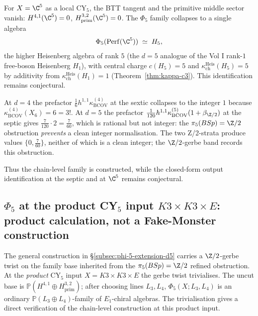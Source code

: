 \begin{example}
\label{ex:c5-higher-heisenberg}
For \(X=\C^5\) as a local CY${}_5$, the BTT tangent and the primitive
middle sector vanish:
\(H^{4,1}(\C^5)=0\), \(H^{3,2}_{\mathrm{prim}}(\C^5)=0\). The $\Phi_5$ family
collapses to a single algebra
\[
 \Phi_5(\mathrm{Perf}(\C^5)) \;\simeq\; H_5,
\]
the higher Heisenberg algebra of rank $5$ \textup{(}the $d = 5$ analogue of the
Vol I rank-$1$ free-boson Heisenberg $H_1$\textup{)}, with central charge
$c(H_5) = 5$ and $\kappa_{\mathrm{ch}}^{\mathrm{Heis}}(H_5) = 5$ by additivity from
$\kappa_{\mathrm{ch}}^{\mathrm{Heis}}(H_1) = 1$ \textup{(}Theorem~\textup{\ref{thm:kappa-c3}}\textup{).} This identification remains conjectural.
\end{example}

\begin{remark}
\label{rem:phi-5-prefactor-not-integer}
At $d = 4$ the prefactor $\tfrac{1}{6} h^{1,1} \kappa_{\mathrm{BCOV}}^{(4)}$ at the sextic
collapses to the integer $1$ because $\kappa_{\mathrm{BCOV}}^{(4)}(X_6) = 6 = 3!$. At $d = 5$
the prefactor $\tfrac{1}{120} h^{1,1} \kappa_{\mathrm{BCOV}}^{(5)} (1 + \beta_{\Z/2})$ at the
septic gives $\tfrac{7}{120} \cdot 2 = \tfrac{7}{60}$, which is rational but not
integer: the $\pi_5(BSp) = \Z/2$ obstruction \emph{prevents} a clean integer
normalisation. The two Z/2-strata produce values $\{0, \tfrac{7}{60}\}$, neither
of which is a clean integer; the $\Z/2$-gerbe band records this obstruction.
\end{remark}
Thus the chain-level family is constructed, while the closed-form
output identification at the septic and at $\C^5$ remains conjectural.

\subsection{\texorpdfstring{$\Phi_5$}{Phi-5} at the product CY\texorpdfstring{${}_5$}{-5} input \texorpdfstring{$K3 \times K3 \times E$}{K3 x K3 x E}:
 product calculation, not a Fake-Monster construction}
\label{subsec:phi-5-K3-K3-E-theorem}

The general construction in \S\ref{subsec:phi-5-extension-d5} carries a
$\Z/2$-gerbe twist on the family base inherited from the $\pi_5(BSp) = \Z/2$
refined obstruction. At the \emph{product} CY${}_5$ input
\(X=K3\times K3\times E\) the gerbe twist trivialises. The uncut base is
\(\mathbb P(H^{4,1}\oplus H^{3,2}_{\mathrm{prim}})\); after choosing
lines \(L_3,L_4\), \(\Phi_5(X;L_3,L_4)\) is an ordinary
\(\mathbb P(L_3\oplus L_4)\)-family of \(E_1\)-chiral algebras. The
trivialisation gives a direct verification of the chain-level construction at
this product input.

